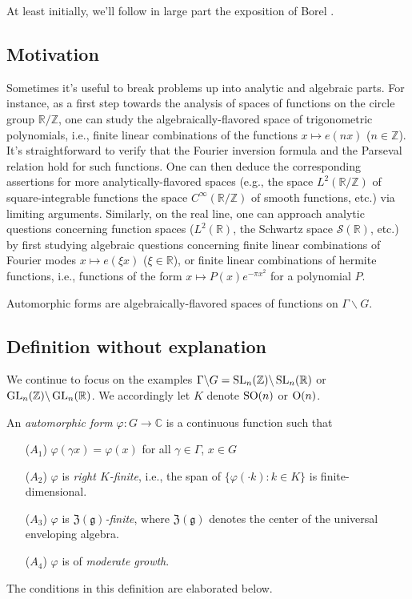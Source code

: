 \documentclass[reqno]{amsart} 
\begin{document}
At least initially, we'll follow in large part the exposition of Borel \cite[\S2]{MR2331343}.
\subsection{Motivation}
Sometimes it's useful to break problems up into analytic and algebraic parts.  For instance, as a first step towards the analysis of spaces of functions on the circle group $\mathbb{R} / \mathbb{Z}$, one can study the algebraically-flavored space of trigonometric polynomials, i.e., finite linear combinations of the functions $x \mapsto e(n x)$ ($n \in \mathbb{Z}$).  It's straightforward to verify that the Fourier inversion formula and the Parseval relation hold for such functions.  One can then deduce the corresponding assertions for more analytically-flavored spaces (e.g., the space $L^2(\mathbb{R}/\mathbb{Z})$ of square-integrable functions the space $C^\infty(\mathbb{R}/\mathbb{Z})$ of smooth functions, etc.) via limiting arguments.  Similarly, on the real line, one can approach analytic questions concerning function spaces ($L^2(\mathbb{R})$, the Schwartz space $\mathcal{S}(\mathbb{R})$, etc.) by first studying algebraic questions concerning finite linear combinations of Fourier modes $x \mapsto e(\xi x)$ ($\xi \in \mathbb{R}$), or finite linear combinations of hermite functions, i.e., functions of the form $x \mapsto P(x) e^{- \pi x^2}$ for a polynomial $P$.

Automorphic forms are algebraically-flavored spaces of functions on $\Gamma \backslash G$.

\subsection{Definition without explanation}\label{sec:defin-with-expl}
We continue to focus on the examples $\Gamma \backslash G = \operatorname{SL}_n (\mathbb{Z}) \backslash \operatorname{SL}_n(\mathbb{R})$ or $\operatorname{GL}_n(\mathbb{Z}) \backslash \operatorname{GL}_n(\mathbb{R})$.  We accordingly let $K$ denote $\operatorname{SO}(n)$ or $\operatorname{O}(n)$.

\begin{definition}\label{defn:an-emph-form}
  An \emph{automorphic form} $\varphi : G \rightarrow \mathbb{C}$ is a continuous function such that
  \begin{enumerate}
  \item [($A_1$)] $\varphi(\gamma x) = \varphi (x)$ for all $\gamma \in \Gamma$, $x \in G$
  \item [($A_2$)] $\varphi$ is \emph{right $K$-finite}, i.e., the span of $\{\varphi(\cdot k) : k \in K\}$ is finite-dimensional.
  \item [($A_3$)] $\varphi$ is \emph{$\mathfrak{Z}(\mathfrak{g})$-finite}, where $\mathfrak{Z}(\mathfrak{g})$ denotes the center of the universal enveloping algebra.
  \item [($A_4$)] $\varphi$ is of \emph{moderate growth}.
  \end{enumerate}
\end{definition}
The conditions in this definition are elaborated below.
\end{document}
